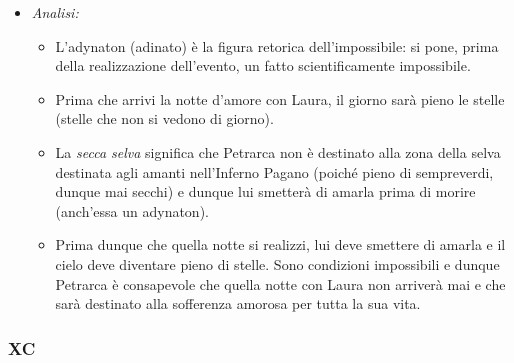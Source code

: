 \documentclass{article}
\begin{document}
\begin{enumerate}
\begin{enumerate}[label=]
\begin{itemize}[label=]
                    \item \textit{Analisi:}
                        \begin{itemize}
                            \item L'adynaton (adinato) è la figura retorica dell'impossibile: si pone, prima della realizzazione dell'evento, un fatto scientificamente impossibile.
                            \item Prima che arrivi la notte d'amore con Laura, il giorno sarà pieno le stelle (stelle che non si vedono di giorno).
                            \item La \textit{secca selva} significa che Petrarca non è destinato alla zona della selva destinata agli amanti nell'Inferno Pagano (poiché pieno di sempreverdi, dunque mai secchi) e dunque lui smetterà di amarla prima di morire (anch'essa un adynaton).
                            \item Prima dunque che quella notte si realizzi, lui deve smettere di amarla e il cielo deve diventare pieno di stelle. Sono condizioni impossibili e dunque Petrarca è consapevole che quella notte con Laura non arriverà mai e che sarà destinato alla sofferenza amorosa per tutta la sua vita.
                        \end{itemize}
                \end{itemize}
        \end{enumerate}
\end{enumerate}

\newpage
\subsubsection{XC}
\end{document}
